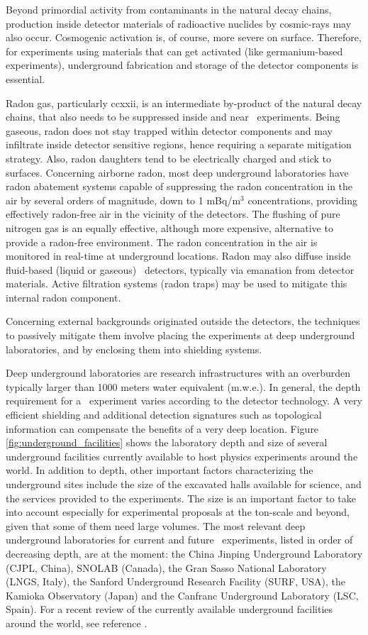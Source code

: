 Beyond primordial activity from contaminants in the natural decay chains, production inside detector materials of radioactive nuclides by cosmic-rays may also occur. Cosmogenic activation is, of course, more severe on surface. Therefore, for experiments using materials that can get activated (like germanium-based experiments), underground fabrication and storage of the detector components is essential.

Radon gas, particularly \Rn{222}, is an intermediate by-product of the natural decay chains, that also needs to be suppressed inside and near \bbonu\ experiments. Being gaseous, radon does not stay trapped within detector components and may infiltrate inside detector sensitive regions, hence requiring a separate mitigation strategy. Also, radon daughters tend to be electrically charged and stick to surfaces. Concerning airborne radon, most deep underground laboratories have radon abatement systems capable of suppressing the radon concentration in the air by several orders of magnitude, down to 1 mBq/m$^3$ concentrations, providing effectively radon-free air in the vicinity of the detectors. The flushing of pure nitrogen gas is an equally effective, although more expensive, alternative to provide a radon-free environment. The radon concentration in the air is monitored in real-time at underground locations. Radon may also diffuse inside fluid-based (liquid or gaseous) \bbonu\ detectors, typically via emanation from detector materials. Active filtration systems (radon traps) may be used to mitigate this internal radon component.

Concerning external backgrounds originated outside the detectors, the techniques to passively mitigate them involve placing the experiments at deep underground laboratories, and by enclosing them into shielding systems. 

Deep underground laboratories are research infrastructures with an overburden typically larger than 1000 meters water equivalent (m.w.e.). In general, the depth requirement for a \bbonu\ experiment varies according to the detector technology. A very efficient shielding and additional detection signatures such as topological information can compensate the benefits of a very deep location. Figure \ref{fig:underground_facilities} shows the laboratory depth and size of several underground facilities currently available to host physics experiments around the world. In addition to depth, other important factors characterizing the underground sites include the size of the excavated halls available for science, and the services provided to the experiments. The size is an important factor to take into account especially for experimental proposals at the ton-scale and beyond, given that some of them need large volumes. The most relevant deep underground laboratories for current and future \bbonu\ experiments, listed in order of decreasing depth, are at the moment: the China Jinping Underground Laboratory (CJPL, China), SNOLAB (Canada), the Gran Sasso National Laboratory (LNGS, Italy), the Sanford Underground Research Facility (SURF, USA), the Kamioka Observatory (Japan) and the Canfranc Underground Laboratory (LSC, Spain). For a recent review of the currently available underground facilities around the world, see reference \cite{Ianni:2023fvs}. 

